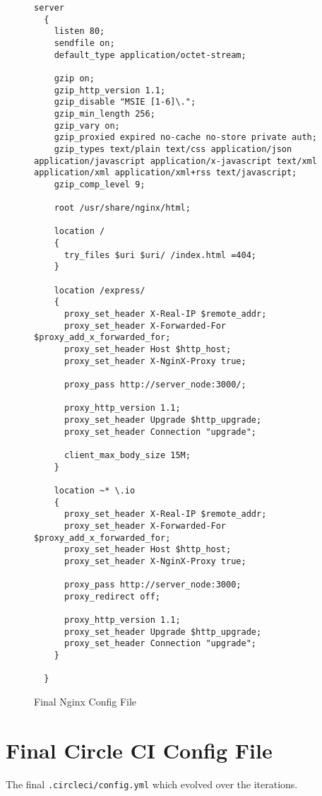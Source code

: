 \begin{figure}[h!]
  \begin{lstlisting}[basicstyle=\tiny, breaklines=true]
  server
  {
    listen 80;
    sendfile on;
    default_type application/octet-stream;

    gzip on;
    gzip_http_version 1.1;
    gzip_disable "MSIE [1-6]\.";
    gzip_min_length 256;
    gzip_vary on;
    gzip_proxied expired no-cache no-store private auth;
    gzip_types text/plain text/css application/json application/javascript application/x-javascript text/xml application/xml application/xml+rss text/javascript;
    gzip_comp_level 9;

    root /usr/share/nginx/html;

    location /
    {
      try_files $uri $uri/ /index.html =404;
    }

    location /express/
    {
      proxy_set_header X-Real-IP $remote_addr;
      proxy_set_header X-Forwarded-For $proxy_add_x_forwarded_for;
      proxy_set_header Host $http_host;
      proxy_set_header X-NginX-Proxy true;

      proxy_pass http://server_node:3000/;

      proxy_http_version 1.1;
      proxy_set_header Upgrade $http_upgrade;
      proxy_set_header Connection "upgrade";

      client_max_body_size 15M;
    }

    location ~* \.io
    {
      proxy_set_header X-Real-IP $remote_addr;
      proxy_set_header X-Forwarded-For $proxy_add_x_forwarded_for;
      proxy_set_header Host $http_host;
      proxy_set_header X-NginX-Proxy true;

      proxy_pass http://server_node:3000;
      proxy_redirect off;

      proxy_http_version 1.1;
      proxy_set_header Upgrade $http_upgrade;
      proxy_set_header Connection "upgrade";
    }

  }
  \end{lstlisting}
  \caption{Final Nginx Config File}
  \label{sample:nginx}
\end{figure}

\newpage
\section{Final Circle CI Config File}
The final \texttt{.circleci/config.yml} which evolved over the iterations.

